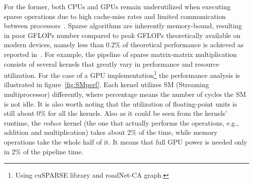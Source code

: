 For the former, both CPUs and GPUs remain underutilized when executing sparse operations due to high cache-miss rates and limited communication between processors~\cite{Song_2016}. Sparse algorithms are inherently memory-bound, resulting in poor GFLOPs number compared to peak GFLOPs theoretically available on modern devices, namely less than $0.2\%$ of theoretical performance is achieved as reported in~\cite{leskovec2016snap, Florida}. For example, the pipeline of sparse matrix-matrix multiplication consists of several kernels that greatly vary in performance and resource utilization. For the case of a GPU implementation\footnote{Using cuSPARSE library and roadNet-CA graph.} the performance analysis is illustrated in figure~\ref{fig:SMperf}. Each kernel utilizes SM (Streaming multiprocessor) differently, where percentage means the number of cycles the SM is not idle. It is also worth noting that the utilization of floating-point units is still about 0\% for all the kernels. Also as it could be seen from the kernels' runtime, the \emph{reduce} kernel (the one that actually performs the operations, e.g., addition and multiplication) takes about 2\% of the time, while memory operations take the whole half of it. It means that full GPU power is needed only in 2\% of the pipeline time. 


